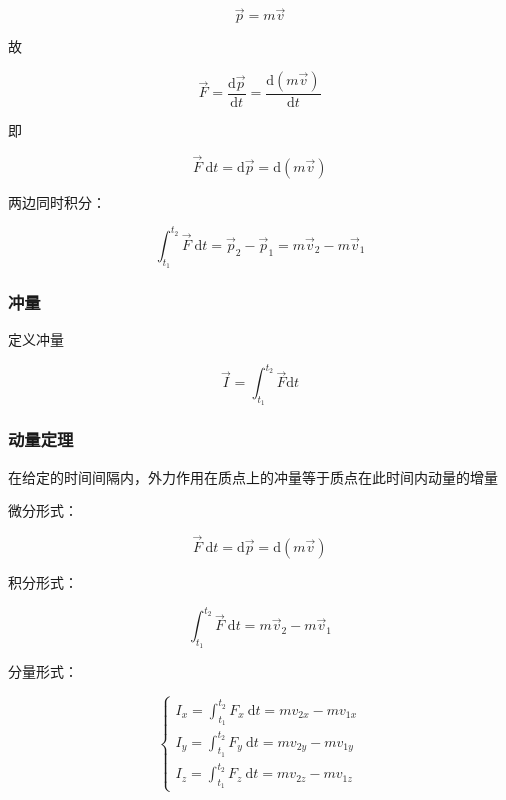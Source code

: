 \documentclass[
	12pt, %
	a4paper, %
]{myLegrandOrangeBook}
\newcommand{\rmd}{\mathrm{d}}
\newcommand{\deriv}[2]{\frac{\rmd #1}{\rmd #2}}
\begin{document}
\begin{equation}
    \overrightarrow{p} = m\overrightarrow{v}
\end{equation}

故

\begin{equation}
    \overrightarrow{F} = \deriv{\overrightarrow{p}}{t} = \deriv{\left(m\overrightarrow{v}\right)}{t}
\end{equation}

即

$$
    \overrightarrow{F} \mathrm{~d} t=\mathrm{d} \overrightarrow{p}=\mathrm{d}(m \overrightarrow{v})
$$

两边同时积分：

$$
    \int_{t_1}^{t_2} \overrightarrow{F} \mathrm{~d} t=\overrightarrow{p}_2-\overrightarrow{p}_1=
    m \overrightarrow{v}_2-m \overrightarrow{v}_1
$$

\subsubsection*{冲量}

定义冲量

\begin{equation}
    \overrightarrow{I} = \int_{t_1}^{t_2} \overrightarrow{F} \rmd t
\end{equation}

\subsubsection*{动量定理}

在给定的时间间隔内，外力作用在质点上的冲量等于质点在此时间内动量的增量

微分形式：

\begin{equation}
    \overrightarrow{F} \mathrm{~d} t=\mathrm{d} \overrightarrow{p}=\mathrm{d}(m \overrightarrow{v})
\end{equation}

积分形式：

\begin{equation}
    \int_{t_1}^{t_2} \overrightarrow{F} \mathrm{~d} t = m \overrightarrow{v}_2-m \overrightarrow{v}_1
\end{equation}

分量形式：

\begin{equation}
    \left\{\begin{array}{l}
    I_x=\int_{t_1}^{t_2} F_x \mathrm{~d} t=m v_{2 x}-m v_{1 x} \\
    I_y=\int_{t_1}^{t_2} F_y \mathrm{~d} t=m v_{2 y}-m v_{1 y} \\
    I_z=\int_{t_1}^{t_2} F_z \mathrm{~d} t=m v_{2 z}-m v_{1 z}
    \end{array}\right.
\end{equation}
\end{document}
